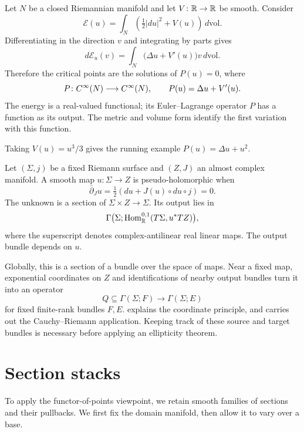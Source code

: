 \begin{example}
Let $N$ be a closed Riemannian manifold and let $V\colon\mathbb{R}\to\mathbb{R}$ be smooth. Consider
\[
 \mathcal E(u)=\int_N\left(\tfrac12|du|^2+V(u)\right)\,d\mathrm{vol}.
\]
Differentiating in the direction $v$ and integrating by parts gives
\[
 d\mathcal E_u(v)=\int_N\bigl(\Delta u+V'(u)\bigr)v\,d\mathrm{vol}.
\]
Therefore the critical points are the solutions of
$P(u)=0$, where
\[
 P\colon C^\infty(N)\longrightarrow C^\infty(N),\qquad
 P(u)=\Delta u+V'(u).
\]
The energy is a real-valued functional; its Euler--Lagrange operator $P$
has a function as its output. The metric and volume form identify the
first variation with this function.

Taking $V(u)=u^3/3$ gives the running example $P(u)=\Delta u+u^2$.
\end{example}

\begin{example}
Let $(\Sigma,j)$ be a fixed Riemann surface and $(Z,J)$ an almost complex manifold.
A smooth map $u\colon\Sigma\to Z$ is pseudo-holomorphic when
\[
 \bar\partial_Ju=\tfrac12(du+J(u)\circ du\circ j)=0.
\]
The unknown is a section of $\Sigma\times Z\to\Sigma$.
Its output lies in
\[
 \Gamma\bigl(\Sigma;
 \operatorname{Hom}^{0,1}_{\mathbb{R}}(T\Sigma,u^*TZ)\bigr),
\]
where the superscript denotes complex-antilinear real linear maps.
The output bundle depends on $u$.

Globally, this is a section of a bundle over the space of maps.
Near a fixed map, exponential coordinates on $Z$ and identifications
of nearby output bundles turn it into an operator
\[
 Q\subseteq\Gamma(\Sigma;F)\longrightarrow\Gamma(\Sigma;E)
\]
for fixed finite-rank bundles $F,E$.
 explains the coordinate principle, and  carries out
the Cauchy--Riemann application. Keeping track of these source and target
bundles is necessary before applying an ellipticity theorem.
\end{example}

\section{Section stacks}

To apply the functor-of-points viewpoint, we retain smooth families of
sections and their pullbacks. We first fix the domain manifold, then
allow it to vary over a base.

